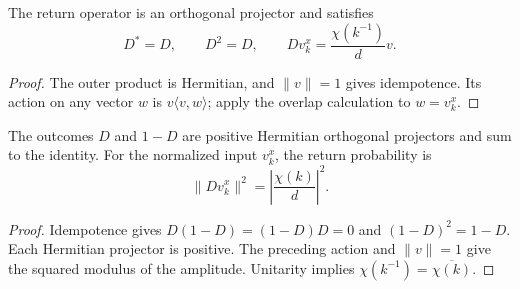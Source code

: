 \begin{lemma}
    \label{thm:peps_regular_charge_pair_return_projection}
    \leanok
    The return operator is an orthogonal projector and satisfies
    \[
        D^*=D,\qquad D^2=D,\qquad
        Dv_k^x=\frac{\chi(k^{-1})}{d}v.
    \]
\end{lemma}

\begin{proof}\leanok
    The outer product is Hermitian, and $\|v\|=1$ gives idempotence.
    Its action on any vector $w$ is $v\langle v,w\rangle$; apply the overlap
    calculation to $w=v_k^x$.
\end{proof}

\begin{lemma}
    \label{thm:peps_regular_charge_pair_return_probability}
    \leanok
    The outcomes $D$ and $1-D$ are positive Hermitian orthogonal projectors
    and sum to the identity. For the normalized input $v_k^x$, the return
    probability is
    \[
        \|Dv_k^x\|^2=\left|\frac{\chi(k)}{d}\right|^2.
    \]
\end{lemma}

\begin{proof}\leanok
    Idempotence gives $D(1-D)=(1-D)D=0$ and $(1-D)^2=1-D$.
    Each Hermitian projector is positive. The preceding action and
    $\|v\|=1$ give the squared modulus of the amplitude. Unitarity implies
    $\chi(k^{-1})=\overline{\chi(k)}$.
\end{proof}
